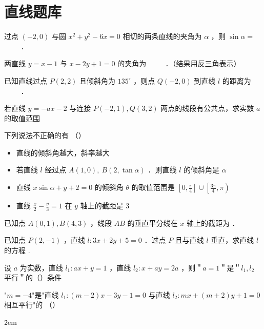 \section{直线题库}

\begin{problemset}
    \item 过点 $(-2,0)$ 与圆 $x^2+y^2-6 x=0$ 相切的两条直线的夹角为 $\alpha$ ，则 $\sin \alpha=$ \underline{$\qquad$} ．
    \item 两直线 $y=x-1$ 与 $x-2 y+1=0$ 的夹角为 \underline{$\qquad$} ．（结果用反三角表示）
    \item 已知直线过点 $P(2,2)$ 且倾斜角为 $135^{\circ}$ ，则点 $Q(-2,0)$ 到直线 $l$ 的距离为 \underline{$\qquad$} ．
    \item 若直线 $y=-a x-2$ 与连接 $P(-2,1), Q(3,2)$ 两点的线段有公共点，求实数 $a$ 的取值范围
    \item 下列说法不正确的有 （\qquad）
    \begin{itemize}
        \item 直线的倾斜角越大，斜率越大
        \item 若直线 $l$ 经过点 $A(1,0), ~ B(2, \tan \alpha)$ ．则直线 $l$ 的倾斜角是 $\alpha$
        \item 直线 $x \sin \alpha+y+2=0$ 的倾斜角 $\theta$ 的取值范围是 $\left[0, \frac{\pi}{4}\right] \cup\left[\frac{3 \pi}{4}, \pi\right)$
        \item 直线 $\frac{x}{2}-\frac{y}{3}=1$ 在 $y$ 轴上的截距是 3
    \end{itemize}
    \item 已知点 $A(0,1), B(4,3)$ ，线段 $A B$ 的垂直平分线在 $x$ 轴上的截距为 \underline{\qquad} ．
    \item 已知点 $P(2,-1)$ ，直线 $l: 3 x+2 y+5=0$ ．过点 $P$ 且与直线 $l$ 垂直，求直线 $l$ 的方程 \underline{\qquad}.
    \item 设 $a$ 为实数，直线 $l_1: a x+y=1$ ，直线 $l_2: x+a y=2 a$ ，则＂$a=1$＂是＂$l_1, l_2$ 平行＂的（\quad）条件
    \item "$m=-4$"是"直线 $l_1:(m-2) x-3 y-1=0$ 与直线 $l_2: m x+(m+2) y+1=0$ 相互平行"的 （\qquad）
\end{problemset}

\v{2em}

